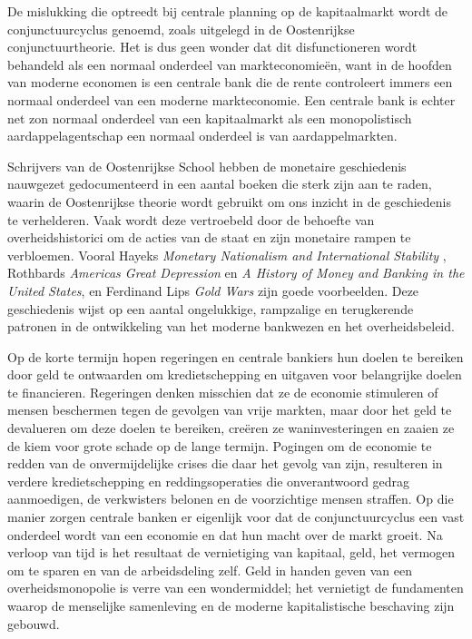 \documentclass[
  a5paper,
  smalldemyvopaper,11pt,twoside,onecolumn,openright,extrafontsizes,
hidelinks]{memoir}
\begin{document}
De mislukking die optreedt bij centrale planning op de kapitaalmarkt
wordt de conjunctuurcyclus genoemd, zoals uitgelegd in de Oostenrijkse
conjunctuurtheorie. Het is dus geen wonder dat dit disfunctioneren wordt
behandeld als een normaal onderdeel van markteconomieën, want in de
hoofden van moderne economen is een centrale bank die de rente
controleert immers een normaal onderdeel van een moderne markteconomie.
Een centrale bank is echter net zon normaal onderdeel van een
kapitaalmarkt als een monopolistisch aardappelagentschap een normaal
onderdeel is van aardappelmarkten.

Schrijvers van de Oostenrijkse School hebben de monetaire geschiedenis
nauwgezet gedocumenteerd in een aantal boeken die sterk zijn aan te
raden, waarin de Oostenrijkse theorie wordt gebruikt om ons inzicht in
de geschiedenis te verhelderen. Vaak wordt deze vertroebeld door de
behoefte van overheidshistorici om de acties van de staat en zijn
monetaire rampen te verbloemen. Vooral Hayeks \emph{Monetary Nationalism
and International Stability} , Rothbards \emph{Americas Great
Depression} en \emph{A History of Money and Banking in the United
States}, en Ferdinand Lips \emph{Gold Wars} zijn goede voorbeelden. Deze
geschiedenis wijst op een aantal ongelukkige, rampzalige en terugkerende
patronen in de ontwikkeling van het moderne bankwezen en het
overheidsbeleid.

Op de korte termijn hopen regeringen en centrale bankiers hun doelen te
bereiken door geld te ontwaarden om kredietschepping en uitgaven voor
belangrijke doelen te financieren. Regeringen denken misschien dat ze de
economie stimuleren of mensen beschermen tegen de gevolgen van vrije
markten, maar door het geld te devalueren om deze doelen te bereiken,
creëren ze waninvesteringen en zaaien ze de kiem voor grote schade op de
lange termijn. Pogingen om de economie te redden van de onvermijdelijke
crises die daar het gevolg van zijn, resulteren in verdere
kredietschepping en reddingsoperaties die onverantwoord gedrag
aanmoedigen, de verkwisters belonen en de voorzichtige mensen straffen.
Op die manier zorgen centrale banken er eigenlijk voor dat de
conjunctuurcyclus een vast onderdeel wordt van een economie en dat hun
macht over de markt groeit. Na verloop van tijd is het resultaat de
vernietiging van kapitaal, geld, het vermogen om te sparen en van de
arbeidsdeling zelf. Geld in handen geven van een overheidsmonopolie is
verre van een wondermiddel; het vernietigt de fundamenten waarop de
menselijke samenleving en de moderne kapitalistische beschaving zijn
gebouwd.
\end{document}
